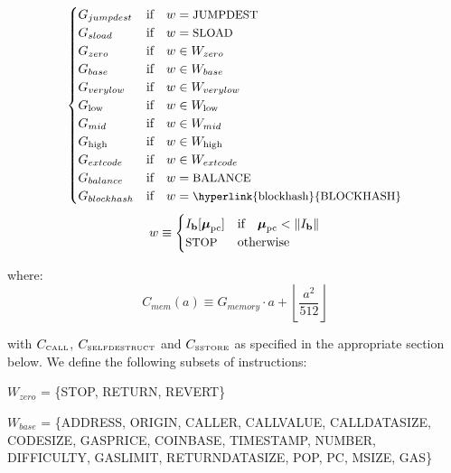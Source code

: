\documentclass[9pt,oneside]{amsart}
\begin{document}
\begin{equation}
\begin{cases}
G_{jumpdest} & \text{if} \quad w = \text{\small JUMPDEST}\\
G_{sload} & \text{if} \quad w = \text{\small SLOAD}\\
G_{zero} & \text{if} \quad w \in W_{zero}\\
G_{base} & \text{if} \quad w \in W_{base}\\
G_{verylow} & \text{if} \quad w \in W_{verylow}\\
G_{\mathrm{low}} & \text{if} \quad w \in W_{\mathrm{low}}\\
G_{mid} & \text{if} \quad w \in W_{mid}\\
G_{\mathrm{high}} & \text{if} \quad w \in W_{\mathrm{high}}\\
G_{extcode} & \text{if} \quad w \in W_{extcode}\\
G_{balance} & \text{if} \quad w = \text{\small BALANCE}\\
G_{blockhash} & \text{if} \quad w = \text{\small \hyperlink{blockhash}{BLOCKHASH}}\\
\end{cases}
\end{equation}
\begin{equation}
w \equiv \begin{cases} I_{\mathbf{b}}[\boldsymbol{\mu}_{\mathrm{pc}}] & \text{if} \quad \boldsymbol{\mu}_{\mathrm{pc}} < \lVert I_{\mathbf{b}} \rVert\\
\text{\small STOP} & \text{otherwise}
\end{cases}
\end{equation}

where:
\begin{equation}
C_{mem}(a) \equiv G_{memory} \cdot a + \left\lfloor \dfrac{a^2}{512} \right\rfloor
\end{equation}

with $C_\text{\tiny CALL}$, $C_\text{\tiny SELFDESTRUCT}$ and $C_\text{\tiny SSTORE}$ as specified in the appropriate section below. We define the following subsets of instructions:

$W_{zero}$ = \{{\small STOP}, {\small RETURN}, {\small REVERT}\}

$W_{base}$ = \{{\small ADDRESS}, {\small ORIGIN}, {\small CALLER}, {\small CALLVALUE}, {\small CALLDATASIZE}, {\small CODESIZE}, {\small GASPRICE}, {\small COINBASE},\newline \noindent\hspace*{1cm} {\small TIMESTAMP}, {\small NUMBER}, {\small DIFFICULTY}, {\small GASLIMIT}, {\small RETURNDATASIZE}, {\small POP}, {\small PC}, {\small MSIZE}, {\small GAS}\}
\end{document}
